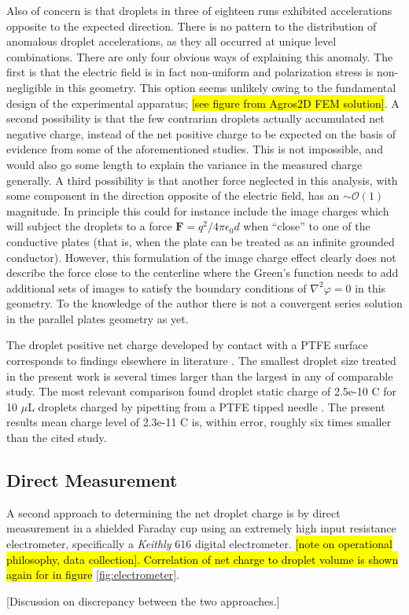 \documentclass[a4paper, 12pt]{article}
\begin{document}
Also of concern is that droplets in three of eighteen runs exhibited accelerations opposite to the expected direction. There is no pattern to the distribution of anomalous droplet accelerations, as they all occurred at unique level combinations. There are only four obvious ways of explaining this anomaly. The first is that the electric field is in fact non-uniform and polarization stress is non-negligible in this geometry. This option seems unlikely owing to the fundamental design of the experimental apparatus; \hl{[see figure from Agros2D FEM solution]}. A second possibility is that the few contrarian droplets actually accumulated net negative charge, instead of the net positive charge to be expected on the basis of evidence from some of the aforementioned studies. This is not impossible, and would also go some length to explain the variance in the measured charge generally. A third possibility is that another force neglected in this analysis, with some component in the direction opposite of the electric field, has an $\sim \mathcal{O}(1)$ magnitude. In principle this could for instance include the image charges which will subject the droplets to a force $\mathbf{F} = q^2/4 \pi \epsilon_0 d$ when ``close'' to one of the conductive plates (that is, when the plate can be treated as an infinite grounded conductor). However, this formulation of the image charge effect clearly does not describe the force close to the centerline where the Green's function needs to add additional sets of images to satisfy the boundary conditions of $\nabla^2 \varphi = 0$ in this geometry. To the knowledge of the author there is not a convergent series solution in the parallel plates geometry as yet. 

The droplet positive net charge developed by contact with a PTFE surface corresponds to findings elsewhere in literature \cite{Choi:2013dg} \cite{Miljkovic:2013dg} \cite{Moreno-Villa:1998dg}. The smallest droplet size treated in the present work is several times larger than the largest in any of comparable study. The most relevant comparison found droplet static charge of 2.5e-10 C for 10 $\mu$L droplets charged by pipetting from a PTFE tipped needle \cite{Choi:2013dg}. The present results mean charge level of 2.3e-11 C is, within error, roughly six times smaller than the cited study. 

\subsection*{Direct Measurement}
A second approach to determining the net droplet charge is by direct measurement in a shielded Faraday cup using an extremely high input resistance electrometer, specifically a \emph{Keithly} 616 digital electrometer. \hl{[note on operational philosophy, data collection]. Correlation of net charge to droplet volume is shown again for in figure} \ref{fig:electrometer}.


[Discussion on discrepancy between the two approaches.]
\end{document}
